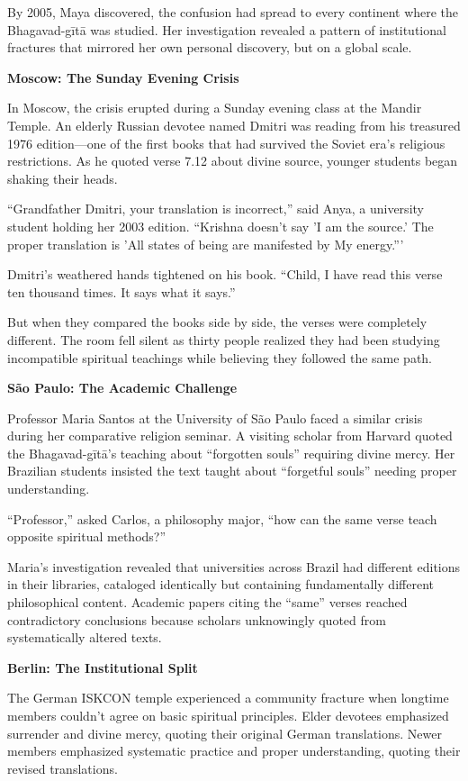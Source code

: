 \documentclass[11pt,twoside]{book}
\begin{document}
By 2005, Maya discovered, the confusion had spread to every continent where the Bhagavad-gītā was studied. Her investigation revealed a pattern of institutional fractures that mirrored her own personal discovery, but on a global scale.

\textbf{Moscow: The Sunday Evening Crisis}

In Moscow, the crisis erupted during a Sunday evening class at the Mandir Temple. An elderly Russian devotee named Dmitri was reading from his treasured 1976 edition—one of the first books that had survived the Soviet era's religious restrictions. As he quoted verse 7.12 about divine source, younger students began shaking their heads.

``Grandfather Dmitri, your translation is incorrect,'' said Anya, a university student holding her 2003 edition. ``Krishna doesn't say 'I am the source.' The proper translation is 'All states of being are manifested by My energy.'''

Dmitri's weathered hands tightened on his book. ``Child, I have read this verse ten thousand times. It says what it says.''

But when they compared the books side by side, the verses were completely different. The room fell silent as thirty people realized they had been studying incompatible spiritual teachings while believing they followed the same path.

\textbf{São Paulo: The Academic Challenge}

Professor Maria Santos at the University of São Paulo faced a similar crisis during her comparative religion seminar. A visiting scholar from Harvard quoted the Bhagavad-gītā's teaching about ``forgotten souls'' requiring divine mercy. Her Brazilian students insisted the text taught about ``forgetful souls'' needing proper understanding.

``Professor,'' asked Carlos, a philosophy major, ``how can the same verse teach opposite spiritual methods?''

Maria's investigation revealed that universities across Brazil had different editions in their libraries, cataloged identically but containing fundamentally different philosophical content. Academic papers citing the ``same'' verses reached contradictory conclusions because scholars unknowingly quoted from systematically altered texts.

\textbf{Berlin: The Institutional Split}

The German ISKCON temple experienced a community fracture when longtime members couldn't agree on basic spiritual principles. Elder devotees emphasized surrender and divine mercy, quoting their original German translations. Newer members emphasized systematic practice and proper understanding, quoting their revised translations.
\end{document}
